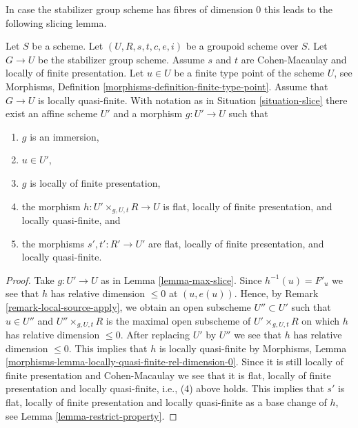 \noindent
In case the stabilizer group scheme has fibres of dimension 0
this leads to the following slicing lemma.

\begin{lemma}
\label{lemma-max-slice-quasi-finite}
Let $S$ be a scheme.
Let $(U, R, s, t, c, e, i)$ be a groupoid scheme over $S$.
Let $G \to U$ be the stabilizer group scheme.
Assume $s$ and $t$ are Cohen-Macaulay and locally of finite presentation.
Let $u \in U$ be a finite type point of the scheme $U$, see
Morphisms, Definition \ref{morphisms-definition-finite-type-point}.
Assume that $G \to U$ is locally quasi-finite.
With notation as in
Situation \ref{situation-slice}
there exist an affine scheme $U'$ and a morphism $g : U' \to U$ such that
\begin{enumerate}
\item $g$ is an immersion,
\item $u \in U'$,
\item $g$ is locally of finite presentation,
\item the morphism $h : U' \times_{g, U, t} R \longrightarrow U$
is flat, locally of finite presentation, and locally quasi-finite, and
\item the morphisms $s', t' : R' \to U'$ are flat,
locally of finite presentation, and locally quasi-finite.
\end{enumerate}
\end{lemma}

\begin{proof}
Take $g : U' \to U$ as in
Lemma \ref{lemma-max-slice}.
Since $h^{-1}(u) = F'_u$ we see that $h$ has relative dimension
$\leq 0$ at $(u, e(u))$. Hence, by
Remark \ref{remark-local-source-apply},
we obtain an open subscheme $U'' \subset U'$ such that
$u \in U''$ and $U'' \times_{g, U, t} R$ is the maximal open subscheme
of $U' \times_{g, U, t} R$ on which $h$ has relative dimension $\leq 0$.
After replacing $U'$ by $U''$ we see that $h$ has relative dimension $\leq 0$.
This implies that $h$ is locally quasi-finite by
Morphisms, Lemma \ref{morphisms-lemma-locally-quasi-finite-rel-dimension-0}.
Since it is still locally of finite presentation and Cohen-Macaulay we see
that it is flat, locally of finite presentation and locally quasi-finite,
i.e., (4) above holds. This implies that $s'$ is flat, locally of finite
presentation and locally quasi-finite as a base change of $h$, see
Lemma \ref{lemma-restrict-property}.
\end{proof}







